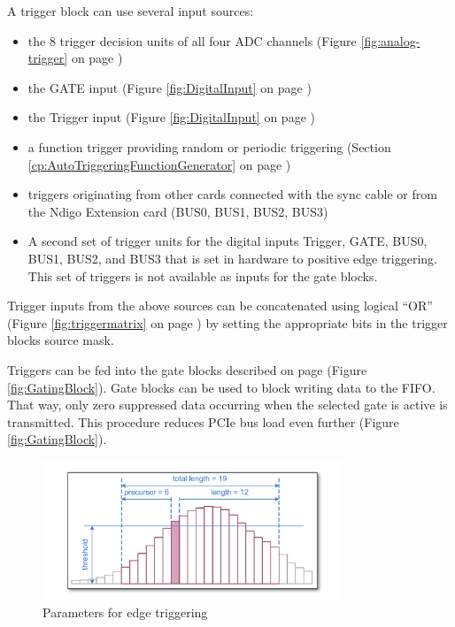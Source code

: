 		A trigger block can use several input sources:

		\begin{itemize}
			\item the 8 trigger decision units of all four ADC channels (Figure \ref{fig:analog-trigger} on page \pageref{fig:analog-trigger})
			\item the GATE input (Figure \ref{fig:DigitalInput} on page \pageref{fig:DigitalInput})
			\item the Trigger input (Figure \ref{fig:DigitalInput} on page \pageref{fig:DigitalInput})
			\item a function trigger providing random or periodic triggering (Section \ref{cp:AutoTriggeringFunctionGenerator} on page \pageref{cp:AutoTriggeringFunctionGenerator})
			\item triggers originating from other cards connected with the sync cable or from the Ndigo Extension card (BUS0, BUS1, BUS2, BUS3)
			\item A second set of trigger units for the digital inputs Trigger, GATE, BUS0, BUS1, BUS2, and BUS3 that is set in hardware to positive edge triggering. This set of triggers is not available as inputs for the gate blocks.
		\end{itemize}

		Trigger inputs from the above sources can be concatenated using logical ``OR'' (Figure \ref{fig:triggermatrix} on page \pageref{fig:triggermatrix}) by setting the appropriate bits in the trigger blocks source mask.\par
		
Triggers can be fed into the gate blocks described on page \pageref{fig:GatingBlock} (Figure \ref{fig:GatingBlock}). Gate blocks can be used to block writing data to the FIFO. That way, only zero suppressed data occurring when the selected gate is active is transmitted. This procedure reduces PCIe bus load even further (Figure \ref{fig:GatingBlock}).

		\begin{figure}[ht]
			\begin{center}
				\includegraphics[width=0.8\textwidth]{figures/edge-trigger.pdf}
				\caption{Parameters for edge triggering\label{fig:edge-trigger}}
			\end{center}
		\end{figure}
		
